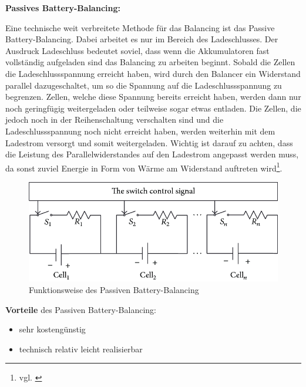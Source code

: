 \textbf{Passives Battery-Balancing:}

Eine technische weit verbreitete Methode für das Balancing ist das Passive Battery-Balancing. Dabei arbeitet es nur im Bereich des Ladeschlusses. Der Ausdruck Ladeschluss bedeutet soviel, dass wenn die Akkumulatoren fast vollständig aufgeladen sind das Balancing zu arbeiten beginnt. Sobald die Zellen die Ladeschlussspannung erreicht haben, wird durch den Balancer ein Widerstand parallel dazugeschaltet, um so die Spannung auf die Ladeschlussspannung zu begrenzen. Zellen, welche diese Spannung bereits erreicht haben, werden dann nur noch geringfügig weitergeladen oder teilweise sogar etwas entladen. Die Zellen, die jedoch noch in der Reihenschaltung verschalten sind und die Ladeschlussspannung noch nicht erreicht haben, werden weiterhin mit dem Ladestrom versorgt und somit weitergeladen. Wichtig ist darauf zu achten, dass die Leistung des Parallelwiderstandes auf den Ladestrom angepasst werden muss, da sonst zuviel Energie in Form von Wärme am Widerstand auftreten wird\footnote{vgl. \cite{PassivBalancing}}.

\begin{figure}[H]
	\begin{center}
		\includegraphics[scale=0.5]{figures/Akku/Passive-cell-balancing.png}
		\caption{Funktionsweise des Passiven Battery-Balancing\cite{FunktionsweisePassivBalancing}}
		\label{fig: Funktionsweise des Passiven Battery-Balancing}
	\end{center}
\end{figure}

\textbf{Vorteile} des Passiven Battery-Balancing:
\begin{itemize}
\item {sehr kostengünstig} \medskip\\
\item {technisch relativ leicht realisierbar} \medskip\\
\end{itemize}

